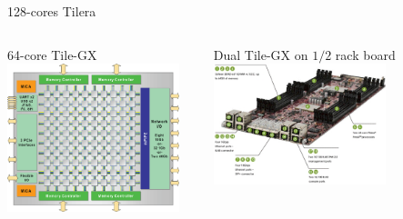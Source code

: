 \documentclass[xcolor=dvipsnames,beamer]{beamer} %
\begin{document}
\begin{frame}[fragile]{128-cores Tilera}

\begin{columns}[l]
\begin{center}
 64-core Tile-GX\newline\linebreak
 \includegraphics[width=5cm]{TILE-Gx_Block_Diagram_large}
\end{center}
\begin{center}
 Dual Tile-GX on {\small $1/2$} rack board\newline\linebreak
 \includegraphics[width=5cm]{tilera_quanta_sq2_mobo}
\end{center}

\end{columns}

\end{frame}
\end{document}
